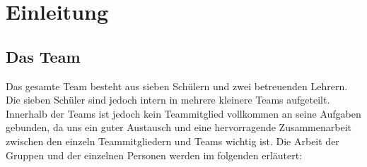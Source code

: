 \section{Einleitung}
\subsection{Das Team}

Das gesamte Team besteht aus sieben Schülern und zwei betreuenden Lehrern. Die sieben Schüler sind jedoch intern in mehrere kleinere Teams aufgeteilt. Innerhalb der Teams ist jedoch kein Teammitglied vollkommen an seine Aufgaben gebunden, da uns ein guter Austausch und eine hervorragende Zusammenarbeit zwischen den einzeln Teammitgliedern und Teams wichtig ist. Die Arbeit der Gruppen und der einzelnen Personen werden im folgenden erläutert:

